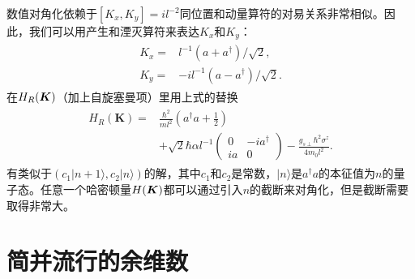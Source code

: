 \begin{appendices}
数值对角化依赖于$[K_x,K_y]=il^{-2}$同位置和动量算符的对易关系非常相似。因此，我们可以用产生和湮灭算符来表达$K_x$和$K_y$：
\begin{align}
\begin{split}
K_x=&l^{-1}(a+a^\dagger)/\sqrt{2},\\
K_y=&-il^{-1}(a-a^\dagger)/\sqrt{2}.
\end{split}
\end{align}
在$H_R(\boldsymbol{K})$（加上自旋塞曼项）里用上式的替换
\begin{align}
\begin{split}
H_{R}(\boldsymbol{K})=&\frac{\hbar^2}{ml^2}(a^{\dagger}a+\frac{1}{2})
\\&+\sqrt{2}\hbar\alpha l^{-1}\left(\begin{array}{cc}
0 & -ia^{\dagger}\\
ia & 0
\end{array}\right)
-\frac{g_{s\perp}\hbar^2\sigma^z}{4m_0l^2}.
\end{split}\label{eq:Rashba-ho}
\end{align}
有类似于$(c_1|n+1\rangle,c_2|n\rangle)$的解，其中$c_1$和$c_2$是常数，$|n\rangle$是$a^\dagger a$的本征值为$n$的量子态。任意一个哈密顿量$H(\boldsymbol{K})$都可以通过引入$n$的截断来对角化，但是截断需要取得非常大。

\chapter{简并流行的余维数}\label{app:codimension}


\end{appendices}
